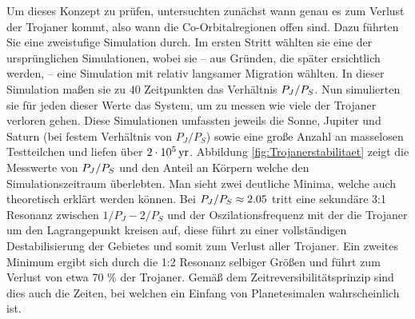 \documentclass[12pt,a4paper,twoside]{article}
\renewcommand{\cite}{\citep}
\begin{document}
Um dieses Konzept zu prüfen, untersuchten \cite{Morbidelli2005} zunächst wann genau es zum Verlust der Trojaner kommt, also wann die Co-Orbitalregionen offen sind.
Dazu führten Sie eine zweistufige Simulation durch. Im ersten Stritt wählten sie eine der ursprünglichen Simulationen, wobei sie – aus Gründen, die später ersichtlich werden, – eine Simulation mit relativ langsamer Migration wählten. %
In dieser Simulation maßen sie zu 40 Zeitpunkten das Verhältnis $P_J/P_S$.
Nun simulierten sie für jeden dieser Werte das System, um zu messen wie viele der Trojaner verloren gehen. Diese Simulationen umfassten jeweils die Sonne, Jupiter und Saturn (bei festem Verhältnis von $P_J/P_S$) sowie eine große Anzahl an masselosen Testteilchen und liefen über $\unit[2\cdot10^5]{yr}$.
Abbildung \ref{fig:Trojanerstabilitaet} zeigt die Messwerte von $P_J/P_S$ und den Anteil an Körpern welche den Simulationszeitraum überlebten. Man sieht zwei deutliche Minima, welche auch theoretisch erklärt werden können.
Bei $P_J/P_S \approx 2.05$ tritt eine sekundäre 3:1 Resonanz zwischen $1/P_J-2/P_S$ und der Oszilationsfrequenz mit der die Trojaner um den Lagrangepunkt kreisen auf, diese führt zu einer vollständigen Destabilisierung der Gebietes und somit zum Verlust aller Trojaner.
Ein zweites Minimum ergibt sich durch die 1:2 Resonanz selbiger Größen und führt zum Verlust von etwa 70 \% der Trojaner.
Gemäß dem Zeitreversibilitätsprinzip sind dies auch die Zeiten, bei welchen ein Einfang von Planetesimalen wahrscheinlich ist.
\end{document}
